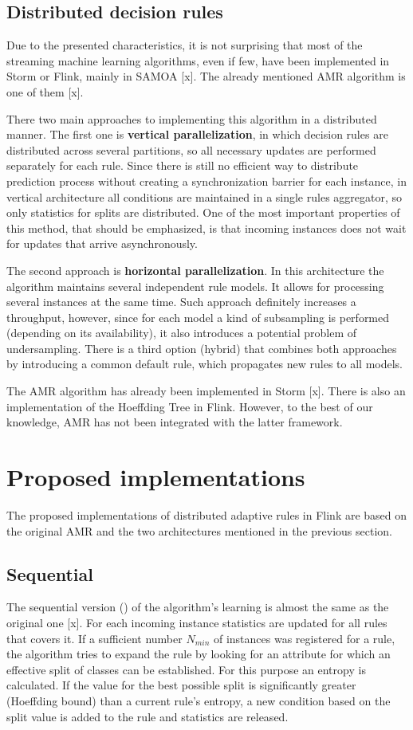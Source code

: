 \documentclass[journal]{IEEEtran}
\newcommand{\textot}[1]{\scalebox{0.95}{\texttt{#1}}}
\begin{document}
\subsection{Distributed decision rules}
Due to the presented characteristics, it is not surprising that most of the streaming machine learning algorithms, even if few, have been implemented in Storm or Flink, mainly in SAMOA [x]. The already mentioned AMR algorithm is one of them [x]. 

There two main approaches to implementing this algorithm in a distributed manner. The first one is \textbf{vertical parallelization}, in which decision rules are distributed across several partitions, so all necessary updates are performed separately for each rule. Since there is still no efficient way to distribute prediction process without creating a synchronization barrier for each instance, in vertical architecture all conditions are maintained in a single rules aggregator, so only statistics for splits are distributed. One of the most important properties of this method, that should be emphasized, is that incoming instances does not wait for updates that arrive asynchronously.

The second approach is \textbf{horizontal parallelization}. In this architecture the algorithm maintains several independent rule models. It allows for processing several instances at the same time. Such approach definitely increases a throughput, however, since for each model a kind of subsampling is performed (depending on its availability), it also introduces a potential problem of undersampling. There is a third option (hybrid) that combines both approaches by introducing a common default rule, which propagates new rules to all models.

The AMR algorithm has already been implemented in Storm [x]. There is also an implementation of the Hoeffding Tree in Flink. However, to the best of our knowledge, AMR has not been integrated with the latter framework.

\section{Proposed implementations}

The proposed implementations of distributed adaptive rules in Flink are based on the original AMR and the two architectures mentioned in the previous section.

\subsection{Sequential}
The sequential version (\textot{SAMR}) of the algorithm's learning is almost the same as the original one [x]. For each incoming instance statistics are updated for all rules that covers it. If a sufficient number $N_{min}$ of instances was registered for a rule, the algorithm tries to expand the rule by looking for an attribute for which an effective split of classes can be established. For this purpose an entropy is calculated. If the value for the best possible split is significantly greater (Hoeffding bound) than a current rule's entropy, a new condition based on the split value is added to the rule and statistics are released.
\end{document}
